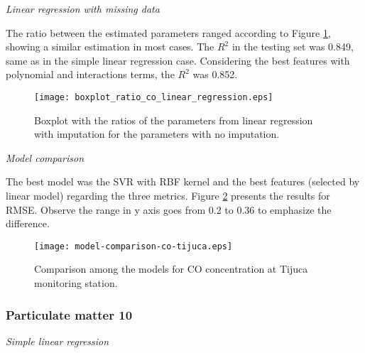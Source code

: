 \vspace{2mm}

{\em Linear regression with missing data} 

\vspace{2mm}

The ratio between the estimated parameters ranged according to Figure
\ref{fig:boxplot-co-linear-regression}, showing a similar estimation in most cases. The $R^2$ in the testing set was
0.849, same as in the simple
linear regression case. Considering the best features with polynomial and
interactions terms, the $R^2$ was 0.852. 

\begin{figure}
    \centering
    \texttt{[image: boxplot\_ratio\_co\_linear\_regression.eps]}
    \caption{Boxplot with the ratios of the parameters from linear regression
    with imputation for the parameters with no imputation.}
    \label{fig:boxplot-co-linear-regression}
\end{figure}

\vspace{2mm}

\vspace{2mm}

{\em Model comparison} 

\vspace{2mm}

The best model was the SVR with RBF kernel and the best features
(selected by linear model) regarding the three metrics. Figure
\ref{fig:model-comparison-co-tijuca} presents the results for RMSE. Observe
the range in y axis goes from 0.2 to 0.36 to emphasize the difference.

\begin{figure}
    \centering
    \texttt{[image: model-comparison-co-tijuca.eps]}
    \caption{Comparison among the models for CO concentration at Tijuca monitoring station.}
    \label{fig:model-comparison-co-tijuca}
\end{figure}


\subsubsection{Particulate matter 10}

{\em Simple linear regression}

\vspace{2mm}

